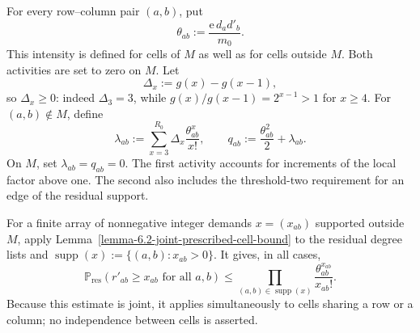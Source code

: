 \documentclass[a4paper,10pt,reqno]{amsart}
\numberwithin{equation}{section}
\theoremstyle{plain}
\theoremstyle{remark}
\begin{document}
For every row--column pair $(a,b)$, put
\begin{equation}
  \theta_{ab}:=
  \frac{\mathrm e\,d_ad'_b}{m_0}.
  \label{eq:theta}
\end{equation}
This intensity is defined for cells of $M$ as well as for cells outside
$M$. Both activities are set to zero on $M$. Let
\[
  \Delta_x:=g(x)-g(x-1),
\]
so $\Delta_x\ge0$: indeed $\Delta_3=3$, while
$g(x)/g(x-1)=2^{x-1}>1$ for $x\ge4$.
For $(a,b)\notin M$, define
\begin{equation}
  \lambda_{ab}
  :=
  \sum_{x=3}^{R_0}\Delta_x\frac{\theta_{ab}^x}{x!},
  \qquad
  q_{ab}
  :=
  \frac{\theta_{ab}^2}{2}+\lambda_{ab}.
  \label{eq:lambda-q}
\end{equation}
On $M$, set $\lambda_{ab}=q_{ab}=0$.
The first activity accounts for increments of the local factor above
one. The second also includes the threshold-two requirement for an edge
of the residual support.

For a finite array of nonnegative integer demands $x=(x_{ab})$ supported
outside $M$, apply Lemma~\ref{lemma-6.2-joint-prescribed-cell-bound} to the
residual degree lists and
$\operatorname{supp}(x):=\{(a,b):x_{ab}>0\}$.  It gives, in all cases,
\begin{equation}
  \mathbb P_{\mathrm{res}}(r'_{ab}\ge x_{ab}\text{ for all }a,b)
  \le
  \prod_{(a,b)\in\operatorname{supp}(x)}
    \frac{\theta_{ab}^{x_{ab}}}{x_{ab}!}.
  \label{eq:prescribed-cell-residual}
\end{equation}
Because this estimate is joint, it applies simultaneously to cells sharing a
row or a column; no independence between cells is asserted.
\end{document}
